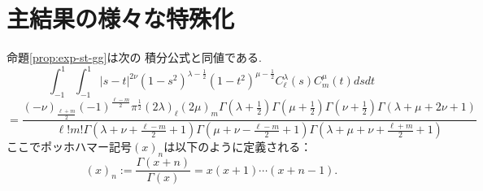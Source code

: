 \documentclass[pdf,notes]{beamer}
\newenvironment{taggedprop}[1]
 {\renewcommand\thetaggedpropx{#1}\taggedpropx}
  {\endtaggedpropx}
\begin{document}
\section{主結果の様々な特殊化}
\begin{frame}
	命題\ref{prop:exp-st-gg}は次の
	積分公式と同値である.
	\begin{taggedprop}{$\;1'$}
		\label{prop:int-st-gg}
		\begin{equation*}
			\int_{- 1}^1 \int_{- 1}^1 | s - t |^{2 \nu} (1 - s^2)^{\lambda - \frac{1}{2}}
			(1 - t^2)^{\mu - \frac{1}{2}} C_\ell^{\lambda} (s) C_m^{\mu} (t) d s d t
		\end{equation*}
		{\scriptsize
		\begin{equation}
			=\frac{(- \nu)_{\frac{\ell + m}{2}} (- 1)^{\frac{\ell - m}{2}} \pi^{\frac{1}{2}} (2
			\lambda)_\ell (2 \mu)_m \Gamma \left( \lambda + \frac{1}{2} \right) \Gamma \left(
			\mu + \frac{1}{2} \right) \Gamma \left( \nu + \frac{1}{2} \right) \Gamma
		(\lambda + \mu + 2 \nu + 1)}{\ell!m! \Gamma \left( \lambda + \nu + \frac{\ell -
		m}{2} + 1 \right) \Gamma \left( \mu + \nu - \frac{\ell - m}{2} + 1 \right) \Gamma
		\left( \lambda + \mu + \nu + \frac{\ell + m}{2} + 1 \right)}
			\label{eqn:int-st-gg}
			\tag{1$'$}
		\end{equation}
		}
	\end{taggedprop}
	ここでポッホハマー記号$(x)_n$は以下のように定義される：\begin{equation*}
		(x)_n:=\frac{\Gamma(x+n)}{\Gamma(x)}=x(x+1)\cdots(x+n-1).
	\end{equation*}
\end{frame}
\end{document}

